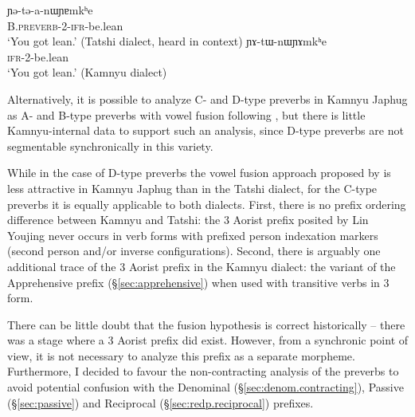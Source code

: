  \begin{exe}
 \ex 
 \begin{xlist}
 \ex \label{ex:YEtanWYAmkhe}
 \gll   ɲə-tə-a-nɯɲɐmkʰe \\
B.\textsc{preverb}-2-\textsc{ifr}-be.lean \\
 \glt `You got lean.' (Tatshi dialect, heard in context)
  \ex \label{ex:YAtWnWYAmkhe}
 \gll   ɲɤ-tɯ-nɯɲɤmkʰe \\
\textsc{ifr}-2-be.lean \\
 \glt `You got lean.' (Kamnyu dialect)
 \end{xlist}
 \end{exe}

Alternatively, it is possible to analyze C- and D-type preverbs in Kamnyu Japhug as A- and B-type preverbs with vowel fusion following \citet{linluo03}, but there is little Kamnyu-internal data to support such an analysis, since D-type preverbs are not segmentable synchronically in this variety.

While in the case of D-type preverbs the vowel fusion approach proposed by \citet{linluo03} is less attractive in Kamnyu Japhug than in the Tatshi dialect, for the C-type preverbs it is equally applicable to both dialects. First, there is no prefix ordering difference  between Kamnyu and Tatshi: the 3\flobv{} Aorist  prefix posited by Lin Youjing never occurs in verb forms with prefixed person indexation markers (second person and/or inverse configurations). Second, there is arguably one additional trace of the 3\flobv{} Aorist  prefix in the Kamnyu dialect: the  variant of the Apprehensive  prefix (§\ref{sec:apprehensive}) when used with transitive verbs in 3\flobv{} form. 

There can be little doubt that the fusion hypothesis is correct historically -- there was a stage where a 3\flobv{} Aorist prefix did exist. However, from a synchronic point of view, it is not necessary to analyze this prefix as a separate morpheme. Furthermore, I decided to favour the non-contracting analysis of the preverbs to avoid potential confusion with the  Denominal (§\ref{sec:denom.contracting}), Passive (§\ref{sec:passive}) and Reciprocal (§\ref{sec:redp.reciprocal}) prefixes.

